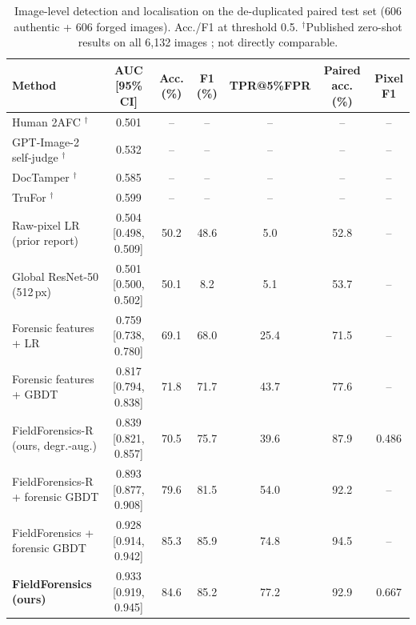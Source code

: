 \documentclass[conference]{IEEEtran}
\begin{document}
\begin{table}[t]
\centering
\caption{Image-level detection and localisation on the de-duplicated paired test set (606 authentic + 606 forged images). Acc./F1 at threshold 0.5. $^\dagger$Published zero-shot results on all 6,132 images \cite{aiforge2}; not directly comparable.}
\label{tab:main}
\footnotesize
\setlength{\tabcolsep}{3pt}
\begin{tabular}{lcccccc}
\toprule
Method & AUC [95\% CI] & Acc. (\%) & F1 (\%) & TPR@5\%FPR & Paired acc. (\%) & Pixel F1 \\
\midrule
Human 2AFC \cite{aiforge2}$^\dagger$ & 0.501 & -- & -- & -- & -- & -- \\
GPT-Image-2 self-judge \cite{forgerjudge}$^\dagger$ & 0.532 & -- & -- & -- & -- & -- \\
DocTamper \cite{doctamper}$^\dagger$ & 0.585 & -- & -- & -- & -- & -- \\
TruFor \cite{trufor}$^\dagger$ & 0.599 & -- & -- & -- & -- & -- \\
Raw-pixel LR (prior report) & 0.504 [0.498, 0.509] & 50.2 & 48.6 & 5.0 & 52.8 & -- \\
Global ResNet-50 (512\,px) & 0.501 [0.500, 0.502] & 50.1 & 8.2 & 5.1 & 53.7 & -- \\
Forensic features + LR & 0.759 [0.738, 0.780] & 69.1 & 68.0 & 25.4 & 71.5 & -- \\
Forensic features + GBDT & 0.817 [0.794, 0.838] & 71.8 & 71.7 & 43.7 & 77.6 & -- \\
FieldForensics-R (ours, degr.-aug.) & 0.839 [0.821, 0.857] & 70.5 & 75.7 & 39.6 & 87.9 & 0.486 \\
FieldForensics-R + forensic GBDT & 0.893 [0.877, 0.908] & 79.6 & 81.5 & 54.0 & 92.2 & -- \\
FieldForensics + forensic GBDT & 0.928 [0.914, 0.942] & 85.3 & 85.9 & 74.8 & 94.5 & -- \\
\textbf{FieldForensics (ours)} & 0.933 [0.919, 0.945] & 84.6 & 85.2 & 77.2 & 92.9 & 0.667 \\
\bottomrule
\end{tabular}
\end{table}
\end{document}
